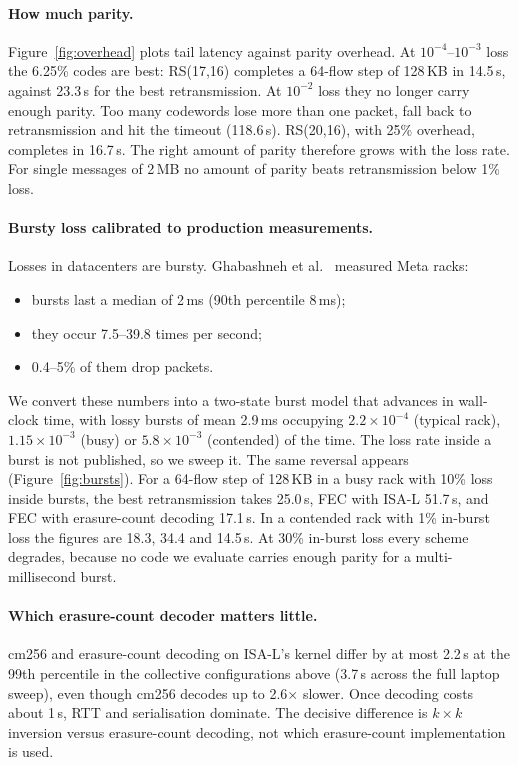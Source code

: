 \paragraph{How much parity.} Figure~\ref{fig:overhead} plots tail latency against parity overhead.
At $10^{-4}$--$10^{-3}$ loss the 6.25\% codes are best: RS(17,16) completes a 64-flow step of
128\,KB in 14.5\,\textmu s, against 23.3\,\textmu s for the best retransmission. At $10^{-2}$ loss
they no longer carry enough parity. Too many codewords lose more than one packet, fall back to
retransmission and hit the timeout (118.6\,\textmu s). RS(20,16), with 25\% overhead, completes in
16.7\,\textmu s. The right amount of parity therefore grows with the loss rate. For single messages
of 2\,MB no amount of parity beats retransmission below 1\% loss.

\paragraph{Bursty loss calibrated to production measurements.} Losses in datacenters are bursty.
Ghabashneh et al.~\cite{ghabashneh2022} measured Meta racks:
\begin{itemize}
  \item bursts last a median of 2\,ms (90th percentile 8\,ms);
  \item they occur 7.5--39.8 times per second;
  \item 0.4--5\% of them drop packets.
\end{itemize}
We convert these numbers into a two-state burst model that advances in wall-clock time, with
lossy bursts of mean 2.9\,ms occupying $2.2\times10^{-4}$ (typical rack), $1.15\times10^{-3}$
(busy) or $5.8\times10^{-3}$ (contended) of the time. The loss rate inside a burst is not
published, so we sweep it. The same reversal appears (Figure~\ref{fig:bursts}). For a 64-flow step
of 128\,KB in a busy rack with 10\% loss inside bursts, the best retransmission takes
25.0\,\textmu s, FEC with ISA-L 51.7\,\textmu s, and FEC with erasure-count decoding
17.1\,\textmu s. In a contended rack with 1\% in-burst loss the figures are 18.3, 34.4 and
14.5\,\textmu s. At 30\% in-burst loss every scheme degrades, because no code we evaluate carries
enough parity for a multi-millisecond burst.

\paragraph{Which erasure-count decoder matters little.} cm256 and erasure-count decoding on ISA-L's
kernel differ by at most 2.2\,\textmu s at the 99th percentile in the collective configurations above
(3.7\,\textmu s across the full laptop sweep), even though cm256 decodes up to 2.6$\times$ slower. Once decoding costs about
1\,\textmu s, RTT and serialisation dominate. The decisive difference is $k\times k$ inversion versus
erasure-count decoding, not which erasure-count implementation is used.

